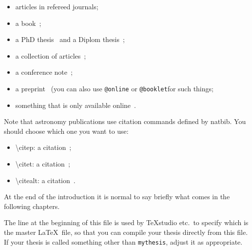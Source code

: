 \begin{itemize}
\item articles in refereed journals\citep{pdg2010,Aad:2010ey};
\item a book~\citep{Halzen:1984mc};
\item a PhD thesis~\citep{tlodd:2012} and a Diplom thesis~\citep{mergelmeyer:2011};
\item a collection of articles~\citep{lhc:vol1};
\item a conference note~\citep{ATLAS-CONF-2011-008};
\item a preprint~\citep{atlas:perf:2009} (you can also use
  \texttt{@online} or \texttt{@booklet}for such things;
\item something that is only available online~\citep{thesis-guide}.
\end{itemize}
Note that astronomy publications use citation commands defined by \textsf{natbib}.
You should choose which one you want to use:
\begin{itemize}
\item \textbackslash citep: a citation~\citep{pdg2010,Aad:2010ey};
\item \textbackslash citet: a citation~\citet{pdg2010,Aad:2010ey};
\item \textbackslash citealt: a citation~\citealt{pdg2010,Aad:2010ey}.
\end{itemize}

At the end of the introduction it is normal to say briefly what comes
in the following chapters.

The line at the beginning of this file is used by TeXstudio etc.\ to
specify which is the master \LaTeX\ file, so that you can compile your thesis
directly from this file.
If your thesis is called something other than \texttt{mythesis}, adjust it as appropriate.

\printbibliography[heading=subbibliography]
